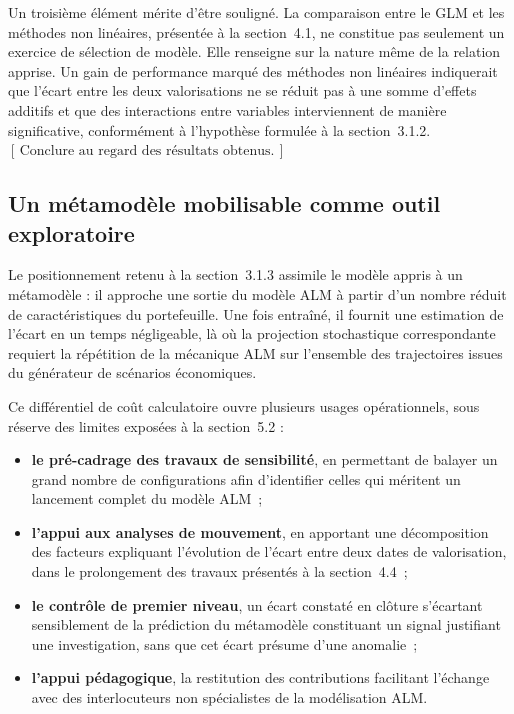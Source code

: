 Un troisième élément mérite d'être souligné. La comparaison entre le GLM et les méthodes non linéaires, présentée à la section~4.1, ne constitue pas seulement un exercice de sélection de modèle. Elle renseigne sur la nature même de la relation apprise. Un gain de performance marqué des méthodes non linéaires indiquerait que l'écart entre les deux valorisations ne se réduit pas à une somme d'effets additifs et que des interactions entre variables interviennent de manière significative, conformément à l'hypothèse formulée à la section~3.1.2. \([\,\text{Conclure au regard des résultats obtenus.}\,]\)

\subsection{Un métamodèle mobilisable comme outil exploratoire}

Le positionnement retenu à la section~3.1.3 assimile le modèle appris à un métamodèle : il approche une sortie du modèle ALM à partir d'un nombre réduit de caractéristiques du portefeuille. Une fois entraîné, il fournit une estimation de l'écart en un temps négligeable, là où la projection stochastique correspondante requiert la répétition de la mécanique ALM sur l'ensemble des trajectoires issues du générateur de scénarios économiques.

Ce différentiel de coût calculatoire ouvre plusieurs usages opérationnels, sous réserve des limites exposées à la section~5.2 :

\begin{itemize}
  \item \textbf{le pré-cadrage des travaux de sensibilité}, en permettant de balayer un grand nombre de configurations afin d'identifier celles qui méritent un lancement complet du modèle ALM~;
  \item \textbf{l'appui aux analyses de mouvement}, en apportant une décomposition des facteurs expliquant l'évolution de l'écart entre deux dates de valorisation, dans le prolongement des travaux présentés à la section~4.4~;
  \item \textbf{le contrôle de premier niveau}, un écart constaté en clôture s'écartant sensiblement de la prédiction du métamodèle constituant un signal justifiant une investigation, sans que cet écart présume d'une anomalie~;
  \item \textbf{l'appui pédagogique}, la restitution des contributions facilitant l'échange avec des interlocuteurs non spécialistes de la modélisation ALM.
\end{itemize}


